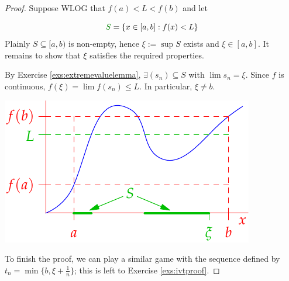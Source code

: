 \begin{proof}
Suppose WLOG that $f(a)<L<f(b)$ and let\par
\begin{minipage}[t]{0.55\linewidth}\vspace{-15pt}
\[\textcolor{Green}{S}=\{x\in[a,b]:f(x)<L\}\]
Plainly $S\subseteq [a,b)$ is non-empty, hence $\xi:=\sup S$ exists and $\xi\in[a,b]$. It remains to show that $\xi$ satisfies the required properties.\medbreak

By Exercise \ref{exs:extremevaluelemma}, $\exists(s_n)\subseteq S$ with $\lim s_n=\xi$.
Since $f$ is continuous, $f(\xi)=\lim f(s_n)\le L$. In particular, $\xi\neq b$.
\end{minipage}\begin{minipage}[t]{0.45\linewidth}\vspace{-15pt}
\flushright\includegraphics{intval}
\end{minipage}\medbreak

To finish the proof, we can play a similar game with the sequence defined by $t_n=\min\{b,\xi+\frac 1n\}$; this is left to Exercise \ref{exs:ivtproof}.
\end{proof}

% 
% 



